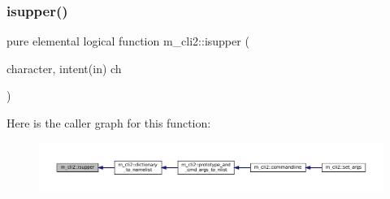 \mbox{\label{namespacem__cli2_ad33ebc8ed3953d8cd91bd8c90a49b59d}} 
\subsubsection{\texorpdfstring{isupper()}{isupper()}}
{\footnotesize\ttfamily pure elemental logical function m\+\_\+cli2\+::isupper (\begin{DoxyParamCaption}\item[{character, intent(in)}]{ch }\end{DoxyParamCaption})\hspace{0.3cm}{\ttfamily [private]}}

Here is the caller graph for this function\+:\nopagebreak
\begin{figure}[H]
\begin{center}
\leavevmode
\includegraphics[width=350pt]{namespacem__cli2_ad33ebc8ed3953d8cd91bd8c90a49b59d_icgraph}
\end{center}
\end{figure}
\mbox{\label{namespacem__cli2_a4c12c311327951984c6e1611da23cdfd}} 
